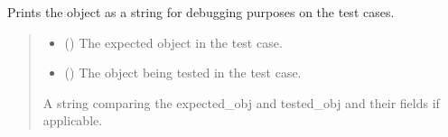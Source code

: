 \documentclass[letterpaper,10pt,english]{sphinxmanual}
\begin{document}

\begin{fulllineitems}
\label{\detokenize{apache_commons_validator_python.util:apache_commons_validator_python.util.datetime_helpers.obj_to_str}}
\pysigstartsignatures
{}
\pysigstopsignatures
\sphinxAtStartPar
Prints the object as a string for debugging purposes on the test cases.
\begin{quote}\begin{description}
\begin{itemize}
\item {} 
\sphinxAtStartPar
{} (\sphinxstyleliteralemphasis{\sphinxupquote{{[}}}\sphinxstyleliteralemphasis{\sphinxupquote{, }}\sphinxstyleliteralemphasis{\sphinxupquote{{]}}}) \textendash{} The expected object in the test case.

\item {} 
\sphinxAtStartPar
{} (\sphinxstyleliteralemphasis{\sphinxupquote{{[}}}\sphinxstyleliteralemphasis{\sphinxupquote{, }}\sphinxstyleliteralemphasis{\sphinxupquote{{]}}}) \textendash{} The object being tested in the test case.

\end{itemize}

\sphinxAtStartPar
A string comparing the expected\_obj and tested\_obj and their fields if applicable.

\end{description}\end{quote}

\end{fulllineitems}
\end{document}
